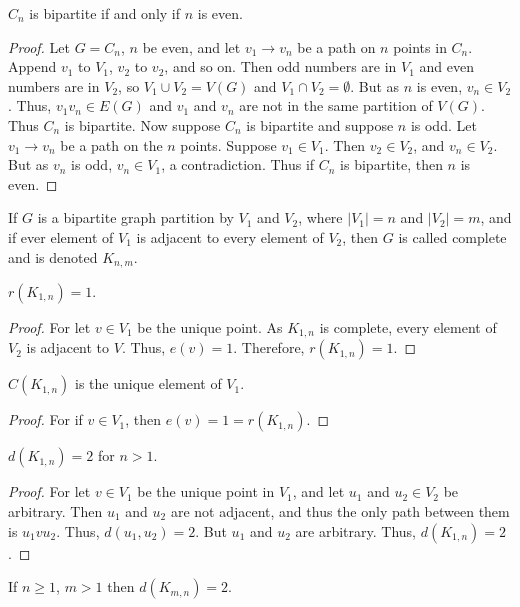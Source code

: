     \begin{theorem}
    $C_n$ is bipartite if and only if $n$ is even. 
    \end{theorem}
    \begin{proof}
    Let $G=C_n$, $n$ be even, and let $v_1\rightarrow v_n$ be a path on $n$ points in $C_n$. Append $v_1$ to $V_1$, $v_2$ to $v_2$, and so on. Then odd numbers are in $V_1$ and even numbers are in $V_2$, so $V_1\cup V_2 = V(G)$ and $V_1 \cap V_2 = \emptyset$. But as $n$ is even, $v_n \in V_2$. Thus, $v_1 v_n \in E(G)$ and $v_1$ and $v_n$ are not in the same partition of $V(G)$. Thus $C_n$ is bipartite. Now suppose $C_n$ is bipartite and suppose $n$ is odd. Let $v_1 \rightarrow v_n$ be a path on the $n$ points. Suppose $v_1 \in V_1$. Then $v_2 \in V_2$, and $v_n \in V_2$. But as $v_n$ is odd, $v_{n} \in V_1$, a contradiction. Thus if $C_n$ is bipartite, then $n$ is even.
    \end{proof}
    \begin{definition}
    If $G$ is a bipartite graph partition by $V_1$ and $V_2$, where $|V_1| = n$ and $|V_2| = m$, and if ever element of $V_1$ is adjacent to every element of $V_2$, then $G$ is called complete and is denoted $K_{n,m}$.
    \end{definition}
    \begin{theorem}
    $r(K_{1,n}) = 1$.
    \end{theorem}
    \begin{proof}
    For let $v\in V_1$ be the unique point. As $K_{1,n}$ is complete, every element of $V_2$ is adjacent to $V$. Thus, $e(v) = 1$. Therefore, $r(K_{1,n}) =1$.
    \end{proof}
    \begin{theorem}
    $C(K_{1,n})$ is the unique element of $V_1$.
    \end{theorem}
    \begin{proof}
    For if $v\in V_1$, then $e(v) = 1 = r(K_{1,n})$.
    \end{proof}
    \begin{theorem}
    $d(K_{1,n})=2$ for $n>1$.
    \end{theorem}
    \begin{proof}
    For let $v\in V_1$ be the unique point in $V_1$, and let $u_1$ and $u_2 \in V_2$ be arbitrary. Then $u_1$ and $u_2$ are not adjacent, and thus the only path between them is $u_1 v u_2$. Thus, $d(u_1,u_2) = 2$. But $u_1$ and $u_2$ are arbitrary. Thus, $d(K_{1,n}) = 2$.
    \end{proof}
    \begin{theorem}
    If $n\geq1$, $m> 1$ then $d(K_{m,n}) = 2$.
    \end{theorem}
